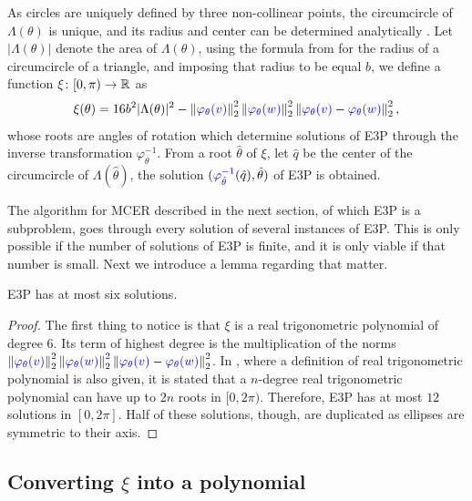 As circles are uniquely defined by three non-collinear points, the circumcircle of $\Lambda(\theta)$ is unique, and its radius and center can be determined analytically \cite{weisstein}.
Let $|\Lambda(\theta)|$ denote the area of $\Lambda(\theta)$, using the formula from \cite[p.~189]{johnson1960} for the radius of a circumcircle of a triangle, and imposing that radius to be equal $b$, we define a function $\xi \colon [0, \pi) \to \mathbb{R}$ as
\begin{equation}\label{eq:xi}
\xi(\theta) = 16b^2|\Lambda(\theta)|^2 - \left\lVert{\color{blue}\varphi_\theta(v)}\right\rVert_{2}^2\left\lVert{\color{blue}\varphi_\theta(w)}\right\rVert_{2}^2\left\lVert{\color{blue}\varphi_\theta(v)}-{\color{blue}\varphi_\theta(w)}\right\rVert_{2}^2,
\end{equation}
whose roots are angles of rotation which determine solutions of E3P through the inverse transformation {\color{blue}$\varphi_\theta^{-1}$}.
From a root $\hat{\theta}$ of $\xi$, let $\hat{q}$ be the center of the circumcircle of $\Lambda(\hat{\theta})$, the solution $({\color{blue}\varphi_{\hat{\theta}}^{-1}}(\hat{q}), \hat{\theta})$ of E3P is obtained. 

The algorithm for MCER described in the next section, of which E3P is a subproblem, goes through every solution of several instances of E3P. This is only possible if the number of solutions of E3P is finite, and it is only viable if that number is small. Next we introduce a lemma regarding that matter.

\begin{lem}\label{lema:e3p}
	E3P has at most six solutions.
\end{lem}

\begin{proof}
	The first thing to notice is that $\xi$ is a real trigonometric polynomial of degree $6$. 
	Its term of highest degree is the multiplication of the norms $\left\lVert{\color{blue}\varphi_\theta(v)}\right\rVert_{2}^2\left\lVert{\color{blue}\varphi_\theta(w)}\right\rVert_{2}^2\left\lVert{\color{blue}\varphi_\theta(v)}-{\color{blue}\varphi_\theta(w)}\right\rVert_{2}^2$. In \cite[p.~150]{powell}, where a definition of real trigonometric polynomial is also given, it is stated that a $n$-degree real trigonometric polynomial can have up to $2n$ roots in $[0, 2\pi)$. Therefore, E3P has at most $12$ solutions in $[0, 2\pi]$.
	Half of these solutions, though, are duplicated as ellipses are symmetric to their axis.
\end{proof}

\subsection{Converting $\xi$ into a polynomial}

